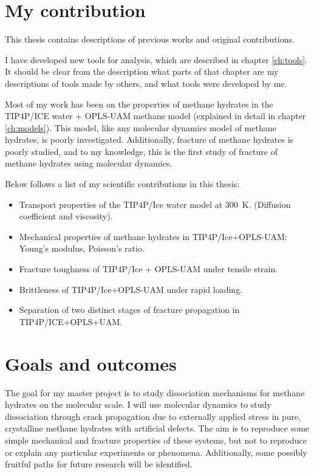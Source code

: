 \section{My contribution}
This thesis contains descriptions of previous works and original contributions.

I have developed new tools for analysis, which are described in chapter \ref{ch:tools}. It should be clear from the description what parts of that chapter are my descriptions of tools made by others, and what tools were developed by me.

Most of my work has been on the properties of methane hydrates in the TIP4P/ICE water + OPLS-UAM methane model (explained in detail in chapter \ref{ch:models}). This model, like any molecular dynamics model of methane hydrates, is poorly investigated. Additionally, fracture of methane hydrates is poorly studied, and to my knowledge, this is the first study of fracture of methane hydrates using molecular dynamics. 

Below follows a list of my scientific contributions in this thesis:

\begin{itemize}
\item Transport properties of the TIP4P/Ice water model at \SI{300}{\kelvin}. (Diffusion coefficient and viscosity).
\item Mechanical properties of methane hydrates in TIP4P/Ice+OPLS-UAM: Young's modulus, Poisson's ratio.
\item Fracture toughness of TIP4P/Ice + OPLS-UAM under tensile strain.
\item Brittleness of TIP4P/Ice+OPLS-UAM under rapid loading.
\item Separation of two distinct stages of fracture propagation in TIP4P/ICE+OPLS+UAM. 
\end{itemize}

\section{Goals and outcomes}
The goal for my master project is to study dissociation mechanisms for methane hydrates on the molecular scale. I will use molecular dynamics to study dissociation through crack propagation due to externally applied stress in pure, crystalline methane hydrates with artificial defects. The aim is to reproduce some simple mechanical and fracture properties of these systems, but not to reproduce or explain any particular experiments or phenomena. Additionally, some possibly fruitful paths for future research will be identified.

